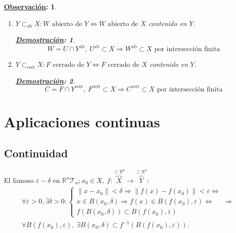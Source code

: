 \documentclass[10pt,a4paper,openright]{book}
\theoremstyle{break}
\newtheorem*{demo}{\underline{Demostración}:}
\newtheorem*{obs}{\underline{Observación}:}
\begin{document}
\begin{obs}
\begin{enumerate}
    \item $Y \subset_{\text{ab}} X: W \text{ abierto de } Y \Leftrightarrow W \text{ abierto de } X$ contenido en $Y$.
    \begin{demo}    
    \[
    W = U \cap Y^{\text{ab}},\ U^{\text{ab}} \subset X \Rightarrow W^{\text{ab}} \subset X \text{ por intersección finita}
    \]
    \end{demo}
    \item $Y \subset_{\text{cerr}} X: F \text{ cerrado de } Y \Leftrightarrow F \text{ cerrado de } X$ contenido en $Y$.
    \begin{demo}
    \[
    C = F \cap Y^{\text{cerr}},\ F^{\text{cerr}} \subset X \Rightarrow C^{\text{cerr}} \subset X \text{ por intersección finita}
    \]
    \end{demo}
\end{enumerate}
\end{obs}

\chapter{Aplicaciones continuas}%
\label{cha:aplicaciones_continuas}
\section{Continuidad}%
\label{sec:continuidad}
El famoso $\varepsilon-\delta$ en $\mathbb{R}^n \mathcal{T}_u; x_0 \in X,\ f : \overbrace{X}^{\subset \mathbb{R}^p} \rightarrow \overbrace{Y}^{\subset \mathbb{R}^q}$: 
\begin{gather*}        
\forall \varepsilon > 0, \exists \delta > 0: 
\begin{cases}
    \lVert x - x_0 \rVert < \delta \Rightarrow \lVert f\left( x \right) - f\left( x_0 \right) \rVert < \varepsilon \Leftrightarrow\\
    x \in B\left( x_0, \delta \right) \Rightarrow f\left( x \right) \in B\left( f\left( x_0 \right), \varepsilon \right) \Leftrightarrow\\
    f\left( B\left( x_0, \delta \right) \right) \subset B\left( f\left( x_0 \right), \varepsilon \right) 
\end{cases} \Rightarrow\\
\boxed{\forall B\left( f\left( x_0 \right), \varepsilon \right),\ \exists B\left( x_0, \delta \right) \subset f^{-1}\left( B\left( f\left( x_0 \right), \varepsilon \right) \right)} 
.\end{gather*}
\end{document}

